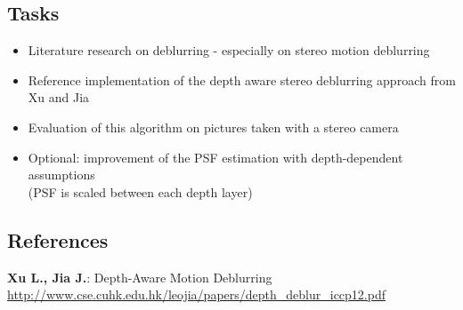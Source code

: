 \documentclass[a4paper, 12pt]{scrartcl}
\begin{document}
\subsection*{Tasks}
\begin{itemize}
\item Literature research on deblurring - especially on stereo motion deblurring
\item Reference implementation of the depth aware stereo deblurring approach from Xu and Jia
\item Evaluation of this algorithm on pictures taken with a stereo camera
\item Optional: improvement of the PSF estimation with depth-dependent assumptions \\(PSF is scaled between each depth layer)
\end{itemize}



\subsection*{References}
\textbf{Xu L., Jia J.}: Depth-Aware Motion Deblurring \\
\url{http://www.cse.cuhk.edu.hk/leojia/papers/depth_deblur_iccp12.pdf}

\end{document}

